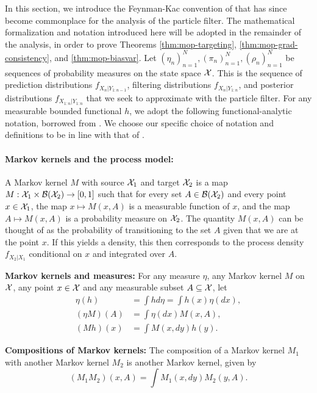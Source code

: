 

In this section, we introduce the Feynman-Kac convention of \cite{delMoral04} that has since become commonplace \cite{karjalainen23} for the analysis of the particle filter. The mathematical formalization and notation introduced here will be adopted in the remainder of the analysis, in order to prove Theorems \ref{thm:mop-targeting}, \ref{thm:mop-grad-consistency}, and \ref{thm:mop-biasvar}. Let $(\eta_n)_{n=1}^N, (\pi_n)_{n=1}^N, (\rho_n)_{n=1}^N$ be sequences of probability measures on the state space ${\mathcal{X}}$. This is the sequence of prediction distributions $f_{X_{n}|Y_{1:n-1}}$, filtering distributions $f_{X_{n}|Y_{1:n}}$, and posterior distributions $f_{X_{1:n}|Y_{1:n}}$ that we seek to approximate with the particle filter. For any measurable bounded functional $h$, we adopt the following functional-analytic notation, borrowed from \cite{delMoral04, chopin20, karjalainen23}. We choose our specific choice of notation and definitions to be in line with that of \cite{karjalainen23}. 


\paragraph{Markov kernels and the process model:} A Markov kernel $M$ with source ${\mathcal{X}}_1$ and target ${\mathcal{X}}_2$ is a map $M: {\mathcal{X}}_1 \times \mathcal{B}({\mathcal{X}}_2) \to [0,1]$ such that for every set $A \in \mathcal{B}({\mathcal{X}}_2)$ and every point $x \in {\mathcal{X}}_1$, the map $x \mapsto M(x, A)$ is a measurable function of $x$, and the map $A \mapsto M(x,A)$ is a probability measure on ${\mathcal{X}}_2$. The quantity $M(x,A)$ can be thought of as the probability of transitioning to the set $A$ given that we are at the point $x$. If this yields a density, this then corresponds to the process density $f_{X_{2}|X_1}$ conditional on $x$ and integrated over $A$.  
\item \textbf{Markov kernels and measures:} For any measure $\eta$, any Markov kernel $M$ on ${\mathcal{X}}$, any point $x \in {\mathcal{X}}$ and any measurable subset $A \subseteq {\mathcal{X}}$, let 
\begin{align}
    \eta(h) &= \int h d\eta = \int h(x) \eta(dx), \\(\eta M)(A) &= \int \eta(dx)M(x,A), \\
    (Mh)(x) &= \int M(x, dy) h(y).
\end{align}
\item \textbf{Compositions of Markov kernels:} The composition of a Markov kernel $M_1$ with another Markov kernel $M_2$ is another Markov kernel, given by 
\begin{equation}
 (M_1M_2)(x, A) = \int M_1(x, dy) M_2(y, A).
\end{equation}

